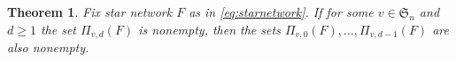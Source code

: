 \documentclass[12pt]{amsart}
\newtheorem{thm}{Theorem}[section]
\theoremstyle{definition}
\numberwithin{equation}{section}
\newcommand{\sn}{\mathfrak{S}_n}
\newcommand{\ctr}[1]{{x}_{#1}}
\begin{document}



\begin{thm}\label{t:decrease defects by 1}
    Fix star network $F$ as in \eqref{eq:starnetwork}.  If for some $v \in \sn$ and $d \geq 1$ the set $\Pi_{v,d}(F)$ is nonempty, then the sets $\Pi_{v,0}(F),\dotsc, \Pi_{v,d-1}(F)$ are also nonempty.
\end{thm}
\end{document}
